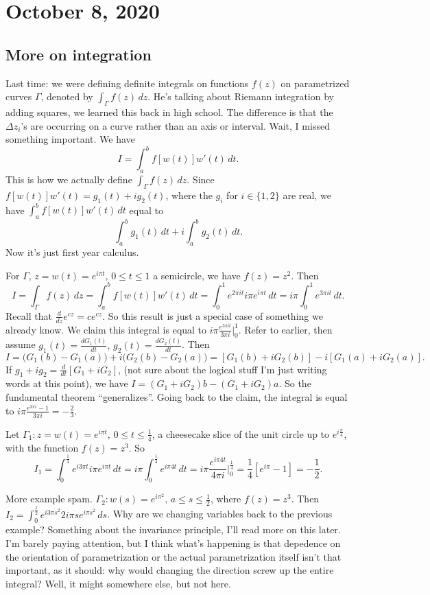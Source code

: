 \section{October 8, 2020}

\subsection{More on integration}
Last time: we were defining definite integrals on functions $f(z)$ on parametrized curves $\Gamma$, denoted by $\int _{\Gamma}f(z) \, dz$. He's talking about Riemann integration by adding squares, we learned this back in high school. The difference is that the $\Delta z_i$'s are occurring on a curve rather than an axis or interval. Wait, I missed something important. We have 
\[
    I= \int_{a}^{b} f[w(t)]w'(t) \, dt.
    \] This is how we actually define $\int _{\Gamma}f(z) \, dz$. Since $f[w(t)]w'(t)=g_1(t)+ig_2(t)$, where the $g_i$ for $i\in \{1,2\} $ are real, we have $\int_{a}^{b} f[w(t)]w'(t) \, dt$ equal to \[
\int_{a}^{b} g_1(t) \, dt+ i \int_{a}^{b} g_2(t) \, dt.
\] Now it's just first year calculus.
\begin{example}
    For $\Gamma$, $z=w(t)=e^{i\pi t},\, 0\leq t\leq 1$ a semicircle, we have $f(z)=z^2$. Then \[
        I=\int _{\Gamma}f(z) \, dz= \int_{a}^{b} f[w(t)]w'(t) \, dt=\int_{0}^{1} e^{2\pi it}i\pi e^{i\pi t} \, dt=i\pi \int_{0}^{1} e^{3\pi it} \, dt.
    \] Recall that $\frac{d}{dz}e^{cz}=ce^{cz}$. So this result is just a special case of something we already know. We claim this integral is equal to $i\pi \frac{e^{3\pi it}}{3\pi i}\Big|^1_0$. Refer to earlier, then assume $g_1(t)=\frac{dG_1(t)}{dt},\,g_2(t)=\frac{dG_2(t)}{dt}$. Then \[
    I=\big(G_1(b)-G_1(a)\big)+i\big(G_2(b)-G_2(a)\big)=[G_1(b)+iG_2(b)]-i[G_1(a)+iG_2(a)].
\] If $g_1+ig_2=\frac{d}{dt}[G_1+iG_2]$, (not sure about the logical stuff I'm just writing words at this point), we have $I=(G_1+iG_2)b-(G_1+iG_2)a$. So the fundamental theorem ``generalizes''.  Going back to the claim, the integral is equal to $i\pi \frac{e^{3\pi i}-1}{3\pi i}=-\frac{2}{3}$.
\end{example}
\begin{example}
    Let $\Gamma_1 \colon z=w(t)=e^{i\pi t},\, 0\leq t \leq \frac{1}{4}$, a cheesecake slice of the unit circle up to $e^{i \frac{\pi}{4}}$, with the function $f(z)=z^3$. So \[
    I_1= \int_{0}^{\frac{1}{4}}e^{i 3\pi t}i\pi e^{i \pi t} \, dt=i\pi \int_{0}^{\frac{1}{4}} e^{i\pi 4t} \, dt=i\pi \frac{e^{i\pi 4t}}{4\pi i}\Big|^{\frac{1}{4}}_0=\frac{1}{4}[e^{i\pi}-1]=-\frac{1}{2}.
    \] 
\end{example}
\begin{example}
    More example spam. $\Gamma_2 \colon w(s)=e^{i\pi ^2},\,a\leq s\leq \frac{1}{2}$, where $f(z)=z^3$. Then $I_2= \int_{0}^{\frac{1}{2}}  e^{i3\pi s^2}2i\pi s e^{i\pi s^2}\, ds$. Why are we changing variables back to the previous example? Something about the invariance principle, I'll read more on this later. I'm barely paying attention, but I think what's happening is that depedence on the orientation of parametrization or the actual parametrization itself isn't that important, as it should: why would changing the direction screw up the entire integral? Well, it might somewhere else, but not here.
\end{example}
